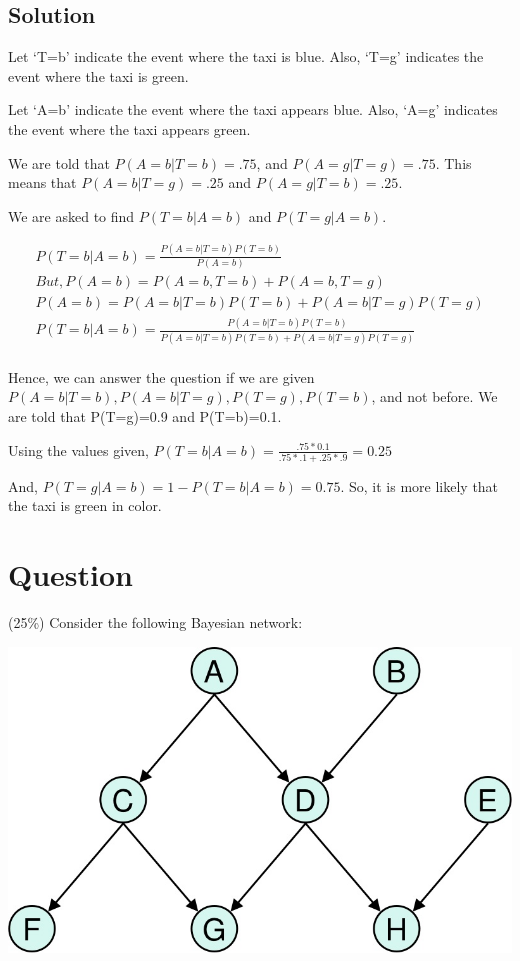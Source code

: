 \documentclass[10pt]{article}
\begin{document}
\subsection{Solution}

Let `T=b' indicate the event where the taxi is blue. Also, `T=g' indicates the event where the taxi is green.

Let `A=b' indicate the event where the taxi appears blue. Also, `A=g' indicates the event where the taxi appears green.

We are told that $P(A=b|T=b) = .75$, and $P(A=g|T=g) = .75$. This means that $P(A=b|T=g) = .25$ and $P(A=g|T=b) = .25$.

We are asked to find $P(T=b|A=b)$ and $P(T=g|A=b)$.

\begin{equation}
\begin{split}
P(T=b|A=b)=\frac{P(A=b|T=b)P(T=b)}{P(A=b)}\\
But, P(A=b) = P(A=b,T=b)+P(A=b,T=g)\\
P(A=b) = P(A=b|T=b)P(T=b)+P(A=b|T=g)P(T=g)\\
P(T=b|A=b)=\frac{P(A=b|T=b)P(T=b)}{P(A=b|T=b)P(T=b)+P(A=b|T=g)P(T=g)}\\
\end{split}
\end{equation}

Hence, we can answer the question if we are given $P(A=b|T=b), P(A=b|T=g), P(T=g), P(T=b)$, and not before. We are told that P(T=g)=0.9 and P(T=b)=0.1.

Using the values given, $P(T=b|A=b)=\frac{.75*0.1}{.75*.1+.25*.9}=0.25$

And, $P(T=g|A=b) = 1-P(T=b|A=b)= 0.75$. So, it is more likely that the taxi is green in color.

\section{Question}
 (25\%) Consider the following Bayesian network:

\begin{center}
 \includegraphics[scale=0.5]{hw4_files/hw4f1.jpg}
\end{center}
\end{document}
